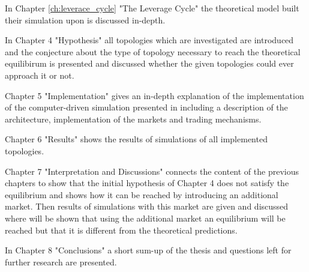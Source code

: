 \documentclass[Bachelorarbeit.tex]{subfiles}
\begin{document}
In Chapter \ref{ch:leverace_cycle} "The Leverage Cycle" the theoretical model \cite{Breuer2015} built their simulation upon is discussed in-depth.

\bigskip

In Chapter 4 "Hypothesis" all topologies which are investigated are introduced and the conjecture about the type of topology necessary to reach the theoretical equilibirum is presented and discussed whether the given topologies could ever approach it or not.

\bigskip

Chapter 5 "Implementation" gives an in-depth explanation of the implementation of the computer-driven simulation presented in \cite{Breuer2015} including a description of the architecture, implementation of the markets and trading mechanisms.

\bigskip

Chapter 6 "Results" shows the results of simulations of all implemented topologies.

\bigskip

Chapter 7 "Interpretation and Discussions" connects the content of the previous chapters to show that the initial hypothesis of Chapter 4 does not satisfy the equilibrium and shows how it can be reached by introducing an additional market. Then results of simulations with this market are given and discussed where will be shown that using the additional market an equilibrium will be reached but that it is different from the theoretical predictions.

\bigskip

In Chapter 8 "Conclusions" a short sum-up of the thesis and questions left for further research are presented.
\end{document}
